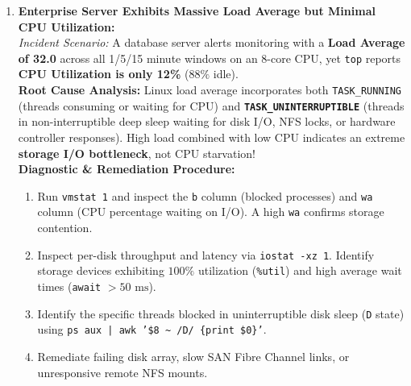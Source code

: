 \begin{enumerate}[label=\textbf{Case \arabic*.},leftmargin=1.5cm]
\item \textbf{Enterprise Server Exhibits Massive Load Average but Minimal CPU Utilization:} \\
\textit{Incident Scenario:} A database server alerts monitoring with a \textbf{Load Average of 32.0} across all 1/5/15 minute windows on an 8-core CPU, yet \texttt{top} reports \textbf{CPU Utilization is only 12\%} ($88\%$ idle). \\
\textbf{Root Cause Analysis:} Linux load average incorporates both \texttt{TASK\_RUNNING} (threads consuming or waiting for CPU) and \textbf{\texttt{TASK\_UNINTERRUPTIBLE}} (threads in non-interruptible deep sleep waiting for disk I/O, NFS locks, or hardware controller responses). High load combined with low CPU indicates an extreme \textbf{storage I/O bottleneck}, not CPU starvation! \\
\textbf{Diagnostic \& Remediation Procedure:}
\begin{enumerate}
    \item Run \texttt{vmstat 1} and inspect the \texttt{b} column (blocked processes) and \texttt{wa} column (CPU percentage waiting on I/O). A high \texttt{wa} confirms storage contention.
    \item Inspect per-disk throughput and latency via \texttt{iostat -xz 1}. Identify storage devices exhibiting $100\%$ utilization (\texttt{\%util}) and high average wait times (\texttt{await} $> 50\text{ ms}$).
    \item Identify the specific threads blocked in uninterruptible disk sleep (\texttt{D} state) using \texttt{ps aux | awk '\$8 \textasciitilde{} /D/ \{print \$0\}'}.
    \item Remediate failing disk array, slow SAN Fibre Channel links, or unresponsive remote NFS mounts.
\end{enumerate}


\end{enumerate}
